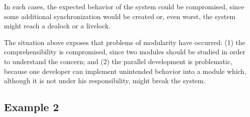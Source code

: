 In such cases, the expected behavior of the system could be
compromised, since some additional synchronization would be created
or, even worst, the system might reach a dealock or a livelock.

The situation above exposes that problems of modularity have
occurred: (1) the comprehensibility is compromised, since two
modules should be studied in order to understand the concern; and
(2) the parallel development is problematic, because one developer
can implement unintended behavior into a module which, although it
is not under his responsibility, might break the system.

%
%
%

\subsection{Example 2}


